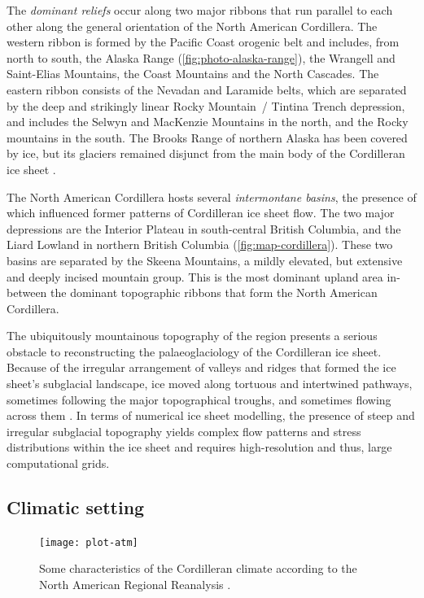 \documentclass[a4paper]{kappa}
\begin{document}
The \emph{dominant reliefs} occur along two major ribbons that run parallel to
each other along the general orientation of the North American Cordillera. The
western ribbon is formed by the Pacific Coast orogenic belt and includes, from
north to south, the Alaska Range (\cref{fig:photo-alaska-range}), the Wrangell
and Saint-Elias Mountains,
the Coast Mountains and the North Cascades. The eastern ribbon consists of the
Nevadan and Laramide belts, which are separated by the deep and strikingly
linear Rocky Mountain~/ Tintina Trench depression, and includes the Selwyn and
MacKenzie Mountains in the north, and the Rocky mountains in the south. The
Brooks Range of northern Alaska has been covered by ice, but its glaciers
remained disjunct from the main body of the Cordilleran ice sheet
\citep{Kaufman.Manley.2004}.

The North American Cordillera hosts several \emph{intermontane basins}, the
presence
of which influenced former patterns of Cordilleran ice sheet flow. The two
major depressions are the Interior Plateau in south-central British Columbia,
and the Liard Lowland in northern British Columbia (\cref{fig:map-cordillera}).
These two basins are separated by the Skeena Mountains, a mildly elevated, but
extensive and deeply incised mountain group. This is the most dominant upland
area in-between the dominant topographic ribbons that form the North American
Cordillera.

The ubiquitously mountainous topography of the region presents a serious
obstacle to reconstructing the palaeoglaciology of the Cordilleran ice sheet.
Because of the irregular arrangement of valleys and ridges that formed the ice
sheet's subglacial landscape, ice moved along tortuous and intertwined
pathways, sometimes following the major topographical troughs, and sometimes
flowing across them \citep{Davis.Mathews.1944, Kleman.etal.2010}. In terms of
numerical ice sheet modelling, the presence of steep and irregular subglacial
topography yields complex flow patterns and stress distributions within the ice
sheet and requires high-resolution and thus, large computational grids.

\subsection{Climatic setting}

\begin{figure}
  \texttt{[image: plot-atm]}
  \caption{Some characteristics of the Cordilleran climate according to the
           North American Regional Reanalysis
           \citep[NARR,][]{Mesinger.etal.2006}.}
  \label{fig:plot-atm}
\end{figure}
\end{document}
